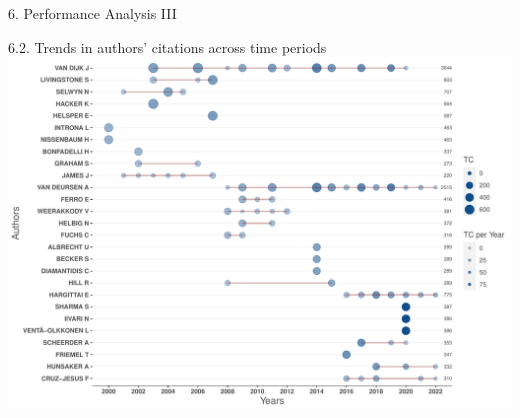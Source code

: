 \documentclass[
  ignorenonframetext,
]{beamer}
\begin{document}
\begin{frame}{6. Performance Analysis III}
\protect\hypertarget{performance-analysis-iii}{}
\begin{block}{6.2. Trends in authors' citations across time periods}
\protect\hypertarget{trends-in-authors-citations-across-time-periods}{}
\includegraphics{Presentation_bibliometric_files/figure-beamer/Influence of AU chart-1.pdf}
\end{block}
\end{frame}
\end{document}
